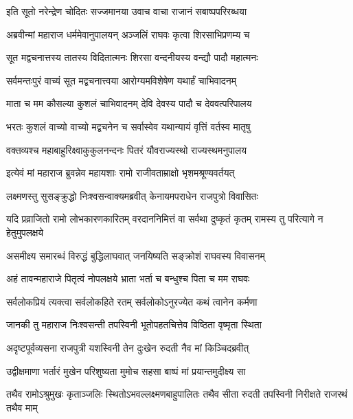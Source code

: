 \twolineshloka
{इति सूतो नरेन्द्रेण चोदितः सज्जमानया}
{उवाच वाचा राजानं सबाष्पपरिरब्धया} %

\twolineshloka
{अब्रवीन्मां महाराज धर्ममेवानुपालयन्}
{अञ्जलिं राघवः कृत्वा शिरसाभिप्रणम्य च} %

\twolineshloka
{सूत मद्वचनात्तस्य तातस्य विदितात्मनः}
{शिरसा वन्दनीयस्य वन्द्यौ पादौ महात्मनः} %

\twolineshloka
{सर्वमन्तःपुरं वाच्यं सूत मद्वचनात्त्वया}
{आरोग्यमविशेषेण यथार्हं चाभिवादनम्} %

\twolineshloka
{माता च मम कौसल्या कुशलं चाभिवादनम्}
{देवि देवस्य पादौ च देववत्परिपालय} %

\twolineshloka
{भरतः कुशलं वाच्यो वाच्यो मद्वचनेन च}
{सर्वास्वेव यथान्यायं वृत्तिं वर्तस्व मातृषु} %

\twolineshloka
{वक्तव्यश्च महाबाहुरिक्ष्वाकुकुलनन्दनः}
{पितरं यौवराज्यस्थो राज्यस्थमनुपालय} %

\twolineshloka
{इत्येवं मां महाराज ब्रुवन्नेव महायशाः}
{रामो राजीवताम्राक्षो भृशमश्रूण्यवर्तयत्} %

\twolineshloka
{लक्ष्मणस्तु सुसङ्क्रुद्धो निःश्वसन्वाक्यमब्रवीत्}
{केनायमपराधेन राजपुत्रो विवासितः} %

\threelineshloka
{यदि प्रव्राजितो रामो लोभकारणकारितम्}
{वरदाननिमित्तं वा सर्वथा दुष्कृतं कृतम्}
{रामस्य तु परित्यागे न हेतुमुपलक्षये} %

\twolineshloka
{असमीक्ष्य समारब्धं विरुद्धं बुद्धिलाघवात्}
{जनयिष्यति सङ्क्रोशं राघवस्य विवासनम्} %

\twolineshloka
{अहं तावन्महाराजे पितृत्वं नोपलक्षये}
{भ्राता भर्ता च बन्धुश्च पिता च मम राघवः} %

\twolineshloka
{सर्वलोकप्रियं त्यक्त्वा सर्वलोकहिते रतम्}
{सर्वलोकोऽनुरज्येत कथं त्वानेन कर्मणा} %

\twolineshloka
{जानकी तु महाराज निःश्वसन्ती तपस्विनी}
{भूतोपहतचित्तेव विष्ठिता वृष्मृता स्थिता} %

\twolineshloka
{अदृष्टपूर्वव्यसना राजपुत्री यशस्विनी}
{तेन दुःखेन रुदती नैव मां किञ्चिदब्रवीत्} %

\twolineshloka
{उद्वीक्षमाणा भर्तारं मुखेन परिशुष्यता}
{मुमोच सहसा बाष्पं मां प्रयान्तमुदीक्ष्य सा} %

\fourlineindentedshloka
{तथैव रामोऽश्रुमुखः कृताञ्जलिः}
{स्थितोऽभवल्लक्ष्मणबाहुपालितः}
{तथैव सीता रुदती तपस्विनी}
{निरीक्षते राजरथं तथैव माम्} %


